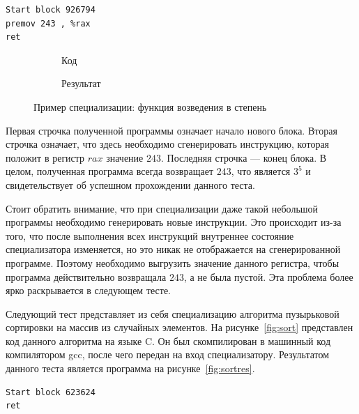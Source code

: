 \newsavebox\boxeight
\begin{lrbox}{\boxeight}
\begin{lstlisting}[xleftmargin = 20pt]
Start block 926794
premov 243 , %rax 
ret
\end{lstlisting}
\end{lrbox}

\begin{figure}[!t]
\centering
	\begin{subfigure}[b]{0.5\textwidth}
	    \centering
        \usebox\boxseven
        \caption{Код\label{fig:int}}
    \end{subfigure}
    	\begin{subfigure}[b]{0.5\textwidth}
	    \centering
        \usebox\boxeight
        \caption{Результат\label{fig:qfbv2}}
    \end{subfigure}
\caption{Пример специализации: функция возведения в степень}
\end{figure}

Первая строчка полученной программы означает начало нового блока. Вторая строчка означает, что здесь необходимо сгенерировать инструкцию, которая положит в регистр $rax$ значение $243$. Последняя строчка --- конец блока.
В целом, полученная программа всегда возвращает $243$, что является $3^5$ и свидетельствует об успешном прохождении данного теста. 

Стоит обратить внимание, что при специализации даже такой небольшой программы необходимо генерировать новые инструкции. Это происходит из-за того, что после выполнения всех инструкций внутреннее состояние специализатора изменяется, но это никак не отображается на сгенерированной программе. Поэтому необходимо выгрузить значение данного регистра, чтобы программа действительно возвращала $243$, а не была пустой. Эта проблема более ярко раскрывается в следующем тесте.

Следующий тест представляет из себя специализацию алгоритма пузырьковой сортировки на массив из случайных элементов. На рисунке~\ref{fig:sort} представлен код данного алгоритма на языке \textsf{C}. Он был скомпилирован в машинный код компилятором gcc, после чего передан на вход специализатору.
Результатом данного теста является программа на рисунке~\ref{fig:sortres}.

\newsavebox\boxnine
\begin{lrbox}{\boxnine}
\begin{lstlisting}[xleftmargin = 20pt]
Start block 623624
ret
\end{lstlisting}
\end{lrbox}


